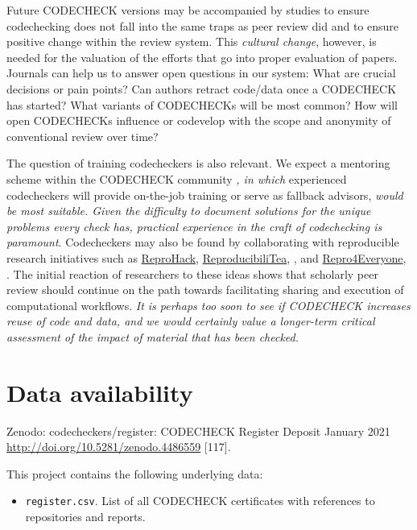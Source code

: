 \documentclass[12pt]{article}
\newcommand{\rev}[1]{\textit{#1}}
\begin{document}
Future CODECHECK versions may be accompanied by studies to ensure
codechecking does not fall into the same traps as peer review did
\cite{tennant_limitations_2020} and to ensure positive change within
the review system.  This \emph{cultural change}, however, is needed
for the valuation of the efforts that go into proper evaluation of
papers.  Journals can help us to answer open questions in our system: What are
crucial decisions or pain points? Can authors retract code/data once a
CODECHECK has started?  What variants of CODECHECKs will be most
common? How will open CODECHECKs influence or codevelop with the scope
and anonymity of conventional review over time?

The question of training codecheckers is also relevant. We expect a
mentoring scheme within the CODECHECK community \rev{, in which} experienced
codecheckers will provide on-the-job training or serve as fallback
advisors, \rev{would be most suitable. Given the difficulty to document 
solutions for the unique problems every check has, practical experience
in the craft of codechecking is paramount}.
Codecheckers may also be found by collaborating with
reproducible research initiatives such as
\href{https://reprohack.github.io/reprohack-hq/}{ReproHack},
\href{https://reproducibilitea.org/}{ReproducibiliTea},
\cite{fitzgibbon_brewing_2020}, and
\href{https://repro4everyone.org/}{Repro4Everyone},
\cite{auer_reproducibility_2020}.  The initial reaction of researchers
to these ideas shows that scholarly peer review should continue on the
path towards facilitating sharing and execution of computational
workflows.  \rev{It is perhaps too soon to see if CODECHECK increases
  reuse of code and data, and we would certainly value a longer-term
  critical assessment of the impact of material that has been checked.}



\section*{Data availability}
Zenodo: codecheckers/register: CODECHECK Register Deposit January 2021 \url{http://doi.org/10.5281/zenodo.4486559} [117].

This project contains the following underlying data:

\begin{itemize}
  \item \texttt{register.csv}. List of all CODECHECK certificates with references to repositories and reports.
\end{itemize}
\end{document}
